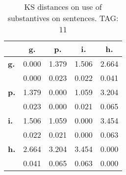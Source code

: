 \begin{table}[h!]
\begin{center}
\begin{tabular}{| l || c | c | c | c |}\hline
 & {\bf g.} & {\bf p.} & {\bf i.} & {\bf h.} \\\hline\hline
{\bf g.} & 0.000 & 1.379 & 1.506 & 2.664 \\
{\bf } & 0.000 & 0.023 & 0.022 & 0.041 \\\hline
{\bf p.} & 1.379 & 0.000 & 1.059 & 3.204 \\
{\bf } & 0.023 & 0.000 & 0.021 & 0.065 \\\hline
{\bf i.} & 1.506 & 1.059 & 0.000 & 3.454 \\
{\bf } & 0.022 & 0.021 & 0.000 & 0.063 \\\hline
{\bf h.} & 2.664 & 3.204 & 3.454 & 0.000 \\
{\bf } & 0.041 & 0.065 & 0.063 & 0.000 \\\hline
\end{tabular}
\caption{KS distances on use of substantives on sentences. TAG: 11}
\end{center}
\end{table}